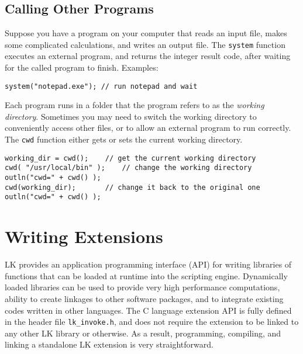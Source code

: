 \documentclass{article}
\begin{document}
%   

\subsection{Calling Other Programs}

Suppose you have a program on your computer that reads an input file, makes some complicated calculations, and writes an output file.  The \texttt{system} function executes an external program, and returns the integer result code, after waiting for the called program to finish.  Examples:

\begin{verbatim}
system("notepad.exe"); // run notepad and wait
\end{verbatim}

Each program runs in a folder that the program refers to as the \emph{working directory}.  Sometimes you may need to switch the working directory to conveniently access other files, or to allow an external program to run correctly.  The \texttt{cwd} function either gets or sets the current working directory.

\begin{verbatim}
working_dir = cwd();    // get the current working directory
cwd( "/usr/local/bin" );    // change the working directory
outln("cwd=" + cwd() );
cwd(working_dir);       // change it back to the original one
outln("cwd=" + cwd() );
\end{verbatim}


\section{Writing Extensions}

LK provides an application programming interface (API) for writing libraries of functions that can be loaded at runtime into the scripting engine.  Dynamically loaded libraries can be used to provide very high performance computations, ability to create linkages to other software packages, and to integrate existing codes written in other languages.  The C language extension API is fully defined in the header file \texttt{lk\_invoke.h}, and does not require the extension to be linked to any other LK library or otherwise.  As a result, programming, compiling, and linking a standalone LK extension is very straightforward.  
\end{document}
